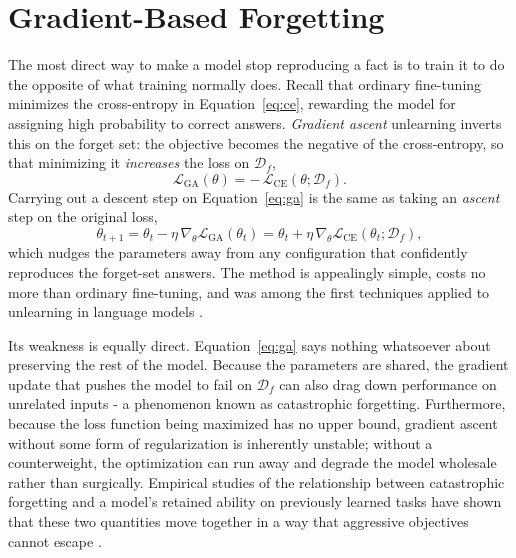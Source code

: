 \documentclass[a4paper,12pt]{report}
\begin{document}
\section{Gradient-Based Forgetting}
The most direct way to make a model stop reproducing a fact is to train it to do the opposite of what training normally does. Recall that ordinary fine-tuning minimizes the cross-entropy in Equation~\eqref{eq:ce}, rewarding the model for assigning high probability to correct answers. \emph{Gradient ascent} unlearning inverts this on the forget set: the objective becomes the negative of the cross-entropy, so that minimizing it \emph{increases} the loss on $\mathcal{D}_f$,
\begin{equation}
	\mathcal{L}_{\mathrm{GA}}(\theta) = -\,\mathcal{L}_{\mathrm{CE}}(\theta; \mathcal{D}_f).
	\label{eq:ga}
\end{equation}
Carrying out a descent step on Equation~\eqref{eq:ga} is the same as taking an \emph{ascent} step on the original loss,
\begin{equation}
	\theta_{t+1} = \theta_t - \eta\,\nabla_\theta \mathcal{L}_{\mathrm{GA}}(\theta_t) = \theta_t + \eta\,\nabla_\theta \mathcal{L}_{\mathrm{CE}}(\theta_t; \mathcal{D}_f),
	\label{eq:ga-update}
\end{equation}
which nudges the parameters away from any configuration that confidently reproduces the forget-set answers. The method is appealingly simple, costs no more than ordinary fine-tuning, and was among the first techniques applied to unlearning in language models \parencite{yao2023unlearning}.

Its weakness is equally direct. Equation~\eqref{eq:ga} says nothing whatsoever about preserving the rest of the model. Because the parameters are shared, the gradient update that pushes the model to fail on $\mathcal{D}_f$ can also drag down performance on unrelated inputs - a phenomenon known as catastrophic forgetting. Furthermore, because the loss function being maximized has no upper bound, gradient ascent without some form of regularization is inherently unstable; without a counterweight, the optimization can run away and degrade the model wholesale rather than surgically. Empirical studies of the relationship between catastrophic forgetting and a model's retained ability on previously learned tasks have shown that these two quantities move together in a way that aggressive objectives cannot escape \parencite{kalajdzievski2024scaling}.
\end{document}

